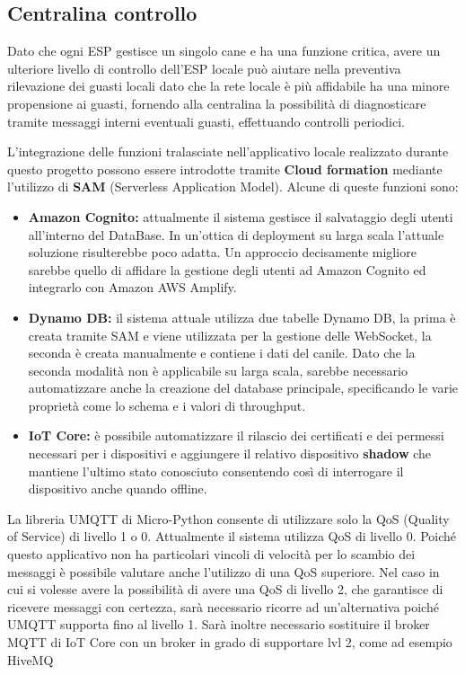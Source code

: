     \subsection{Centralina controllo}
    Dato che ogni ESP gestisce un singolo cane e ha una funzione critica, avere un ulteriore livello di controllo dell'ESP locale può aiutare nella preventiva rilevazione dei guasti locali dato che la rete locale è più affidabile ha una minore propensione ai guasti, fornendo alla centralina la possibilità di diagnosticare tramite messaggi interni eventuali guasti, effettuando controlli periodici.
    
    L'integrazione delle funzioni tralasciate nell'applicativo locale realizzato durante questo progetto possono essere introdotte tramite \textbf{Cloud formation} mediante l'utilizzo di \textbf{SAM} (Serverless Application Model). 
    Alcune di queste funzioni sono:
    \begin{itemize}
        \item \textbf{Amazon Cognito:} attualmente il sistema gestisce il salvataggio degli utenti all'interno del DataBase. In un'ottica di deployment su larga scala l'attuale soluzione risulterebbe poco adatta. Un approccio decisamente migliore sarebbe quello di affidare la gestione degli utenti ad Amazon Cognito ed integrarlo con Amazon AWS Amplify.
        \item \textbf{Dynamo DB:} il sistema attuale utilizza due tabelle Dynamo DB, la prima è creata tramite SAM e viene utilizzata per la gestione delle WebSocket, la seconda è creata manualmente e contiene i dati del canile. Dato che la seconda modalità non è applicabile su larga scala, sarebbe necessario automatizzare anche la creazione del database principale, specificando le varie proprietà come lo schema e i valori di throughput.  
        \item \textbf{IoT Core:} è possibile automatizzare il rilascio dei certificati e dei permessi necessari per i dispositivi e aggiungere il relativo dispositivo \textbf{shadow} che mantiene l'ultimo stato conosciuto consentendo così di interrogare il dispositivo anche quando offline.
    \end{itemize}

La libreria UMQTT di Micro-Python consente di utilizzare solo la QoS (Quality of Service) di livello 1 o 0. Attualmente il sistema utilizza QoS di livello 0. Poiché questo applicativo non ha particolari vincoli di velocità per lo scambio dei messaggi è possibile valutare anche l'utilizzo di una QoS superiore. Nel caso in cui si volesse avere la possibilità di avere una QoS di livello 2, che garantisce di ricevere messaggi con certezza, sarà necessario ricorre ad un'alternativa poiché UMQTT supporta fino al livello 1. Sarà inoltre necessario sostituire il broker MQTT di IoT Core con un broker in grado di supportare lvl 2, come ad esempio HiveMQ


